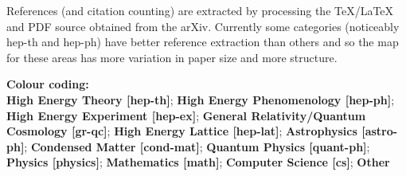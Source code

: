 \documentclass[11pt]{article}
\begin{document}
References (and citation counting) are extracted by processing the TeX/LaTeX and PDF source obtained from the arXiv. 
Currently some categories (noticeably hep-th and hep-ph) have better reference extraction than others and so the map for these areas has more variation in paper size and more structure. 

{\bf Colour coding:}\\
{\bf\color[RGB]{0,0,100} High Energy Theory [hep-th]};
{\bf\color[RGB]{0,100,0} High Energy Phenomenology [hep-ph]}; 
{\bf\color[RGB]{100,100,0} High Energy Experiment [hep-ex]};
{\bf\color[RGB]{0,100,100} General Relativity/Quantum Cosmology [gr-qc]};
{\bf\color[RGB]{70,36,20} High Energy Lattice [hep-lat]};
{\bf\color[RGB]{89,53,60} Astrophysics [astro-ph]};
{\bf\color[RGB]{70,50,40} Condensed Matter [cond-mat]};
{\bf\color[RGB]{40,70,70} Quantum Physics [quant-ph]};
{\bf\color[RGB]{100,0,0} Physics [physics]};
{\bf\color[RGB]{62,86,24} Mathematics [math]};
{\bf\color[RGB]{70,30,60} Computer Science [cs]};
{\bf\color[RGB]{70,10,30} Other}
\end{document}
